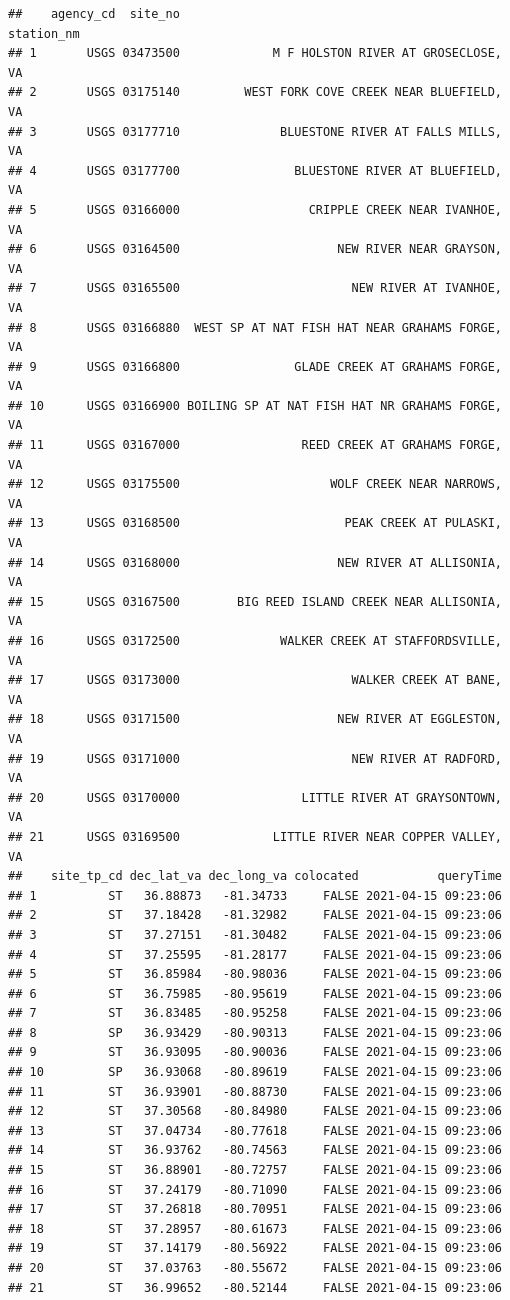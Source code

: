 \documentclass[
]{book}
\begin{document}
\begin{verbatim}
##    agency_cd  site_no                                      station_nm
## 1       USGS 03473500             M F HOLSTON RIVER AT GROSECLOSE, VA
## 2       USGS 03175140         WEST FORK COVE CREEK NEAR BLUEFIELD, VA
## 3       USGS 03177710              BLUESTONE RIVER AT FALLS MILLS, VA
## 4       USGS 03177700                BLUESTONE RIVER AT BLUEFIELD, VA
## 5       USGS 03166000                  CRIPPLE CREEK NEAR IVANHOE, VA
## 6       USGS 03164500                      NEW RIVER NEAR GRAYSON, VA
## 7       USGS 03165500                        NEW RIVER AT IVANHOE, VA
## 8       USGS 03166880  WEST SP AT NAT FISH HAT NEAR GRAHAMS FORGE, VA
## 9       USGS 03166800                GLADE CREEK AT GRAHAMS FORGE, VA
## 10      USGS 03166900 BOILING SP AT NAT FISH HAT NR GRAHAMS FORGE, VA
## 11      USGS 03167000                 REED CREEK AT GRAHAMS FORGE, VA
## 12      USGS 03175500                     WOLF CREEK NEAR NARROWS, VA
## 13      USGS 03168500                       PEAK CREEK AT PULASKI, VA
## 14      USGS 03168000                      NEW RIVER AT ALLISONIA, VA
## 15      USGS 03167500        BIG REED ISLAND CREEK NEAR ALLISONIA, VA
## 16      USGS 03172500              WALKER CREEK AT STAFFORDSVILLE, VA
## 17      USGS 03173000                        WALKER CREEK AT BANE, VA
## 18      USGS 03171500                      NEW RIVER AT EGGLESTON, VA
## 19      USGS 03171000                        NEW RIVER AT RADFORD, VA
## 20      USGS 03170000                 LITTLE RIVER AT GRAYSONTOWN, VA
## 21      USGS 03169500             LITTLE RIVER NEAR COPPER VALLEY, VA
##    site_tp_cd dec_lat_va dec_long_va colocated           queryTime
## 1          ST   36.88873   -81.34733     FALSE 2021-04-15 09:23:06
## 2          ST   37.18428   -81.32982     FALSE 2021-04-15 09:23:06
## 3          ST   37.27151   -81.30482     FALSE 2021-04-15 09:23:06
## 4          ST   37.25595   -81.28177     FALSE 2021-04-15 09:23:06
## 5          ST   36.85984   -80.98036     FALSE 2021-04-15 09:23:06
## 6          ST   36.75985   -80.95619     FALSE 2021-04-15 09:23:06
## 7          ST   36.83485   -80.95258     FALSE 2021-04-15 09:23:06
## 8          SP   36.93429   -80.90313     FALSE 2021-04-15 09:23:06
## 9          ST   36.93095   -80.90036     FALSE 2021-04-15 09:23:06
## 10         SP   36.93068   -80.89619     FALSE 2021-04-15 09:23:06
## 11         ST   36.93901   -80.88730     FALSE 2021-04-15 09:23:06
## 12         ST   37.30568   -80.84980     FALSE 2021-04-15 09:23:06
## 13         ST   37.04734   -80.77618     FALSE 2021-04-15 09:23:06
## 14         ST   36.93762   -80.74563     FALSE 2021-04-15 09:23:06
## 15         ST   36.88901   -80.72757     FALSE 2021-04-15 09:23:06
## 16         ST   37.24179   -80.71090     FALSE 2021-04-15 09:23:06
## 17         ST   37.26818   -80.70951     FALSE 2021-04-15 09:23:06
## 18         ST   37.28957   -80.61673     FALSE 2021-04-15 09:23:06
## 19         ST   37.14179   -80.56922     FALSE 2021-04-15 09:23:06
## 20         ST   37.03763   -80.55672     FALSE 2021-04-15 09:23:06
## 21         ST   36.99652   -80.52144     FALSE 2021-04-15 09:23:06
\end{verbatim}
\end{document}
